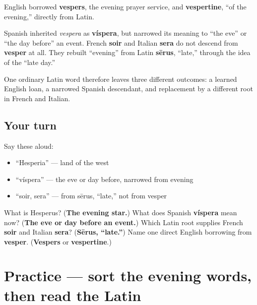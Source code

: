 \begin{cousinweb}
English borrowed \textbf{vespers}, the evening prayer service, and \textbf{vespertine}, \textquotedblleft{}of the evening,\textquotedblright{} directly from Latin.

Spanish inherited \emph{vespera} as \textbf{víspera}, but narrowed its meaning to \textquotedblleft{}the eve\textquotedblright{} or \textquotedblleft{}the day before\textquotedblright{} an event. French \textbf{soir} and Italian \textbf{sera} do not descend from \textbf{vesper} at all. They rebuilt \textquotedblleft{}evening\textquotedblright{} from Latin \textbf{sērus}, \textquotedblleft{}late,\textquotedblright{} through the idea of the \textquotedblleft{}late day.\textquotedblright{}

One ordinary Latin word therefore leaves three different outcomes: a learned English loan, a narrowed Spanish descendant, and replacement by a different root in French and Italian.
\end{cousinweb}

\subsection*{Your turn}
Say these aloud:

\begin{itemize}
\raggedright
  \item \textquotedblleft{}Hesperia\textquotedblright{} — land of the west
  \item \textquotedblleft{}víspera\textquotedblright{} — the eve or day before, narrowed from evening
  \item \textquotedblleft{}soir, sera\textquotedblright{} — from sērus, \textquotedblleft{}late,\textquotedblright{} not from vesper
\end{itemize}

\begin{tcolorbox}[breakable,colback=teal!4,colframe=teal!35!black,title={Before you move on}]
What is Hesperus? (\textbf{The evening star.}) What does Spanish \textbf{víspera} mean now? (\textbf{The eve or day before an event.}) Which Latin root supplies French \textbf{soir} and Italian \textbf{sera}? (\textbf{Sērus, \textquotedblleft{}late.\textquotedblright{}}) Name one direct English borrowing from \textbf{vesper}. (\textbf{Vespers} or \textbf{vespertine}.)
\end{tcolorbox}
\section[Practice]{Practice — sort the evening words, then read the Latin}

